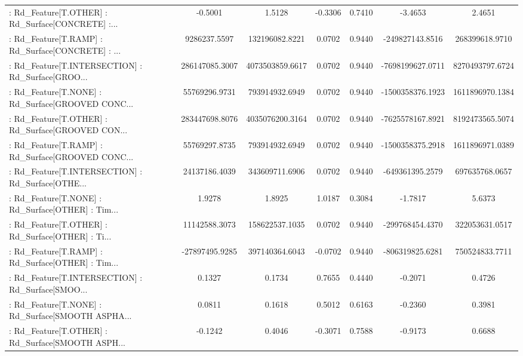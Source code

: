 \begin{longtable}{p{4cm}cccccc}
 : Rd\_Feature[T.OTHER] : Rd\_Surface[CONCRETE] :... &           -0.5001 &            1.5128 & -0.3306 &       0.7410 &            -3.4653 &            2.4651 \\
 : Rd\_Feature[T.RAMP] : Rd\_Surface[CONCRETE] : ... &      9286237.5597 &    132196082.8221 &  0.0702 &       0.9440 &    -249827143.8516 &    268399618.9710 \\
 : Rd\_Feature[T.INTERSECTION] : Rd\_Surface[GROO... &    286147085.3007 &   4073503859.6617 &  0.0702 &       0.9440 &   -7698199627.0711 &   8270493797.6724 \\
 : Rd\_Feature[T.NONE] : Rd\_Surface[GROOVED CONC... &     55769296.9731 &    793914932.6949 &  0.0702 &       0.9440 &   -1500358376.1923 &   1611896970.1384 \\
 : Rd\_Feature[T.OTHER] : Rd\_Surface[GROOVED CON... &    283447698.8076 &   4035076200.3164 &  0.0702 &       0.9440 &   -7625578167.8921 &   8192473565.5074 \\
 : Rd\_Feature[T.RAMP] : Rd\_Surface[GROOVED CONC... &     55769297.8735 &    793914932.6949 &  0.0702 &       0.9440 &   -1500358375.2918 &   1611896971.0389 \\
 : Rd\_Feature[T.INTERSECTION] : Rd\_Surface[OTHE... &     24137186.4039 &    343609711.6906 &  0.0702 &       0.9440 &    -649361395.2579 &    697635768.0657 \\
 : Rd\_Feature[T.NONE] : Rd\_Surface[OTHER] : Tim... &            1.9278 &            1.8925 &  1.0187 &       0.3084 &            -1.7817 &            5.6373 \\
 : Rd\_Feature[T.OTHER] : Rd\_Surface[OTHER] : Ti... &     11142588.3073 &    158622537.1035 &  0.0702 &       0.9440 &    -299768454.4370 &    322053631.0517 \\
 : Rd\_Feature[T.RAMP] : Rd\_Surface[OTHER] : Tim... &    -27897495.9285 &    397140364.6043 & -0.0702 &       0.9440 &    -806319825.6281 &    750524833.7711 \\
 : Rd\_Feature[T.INTERSECTION] : Rd\_Surface[SMOO... &            0.1327 &            0.1734 &  0.7655 &       0.4440 &            -0.2071 &            0.4726 \\
 : Rd\_Feature[T.NONE] : Rd\_Surface[SMOOTH ASPHA... &            0.0811 &            0.1618 &  0.5012 &       0.6163 &            -0.2360 &            0.3981 \\
 : Rd\_Feature[T.OTHER] : Rd\_Surface[SMOOTH ASPH... &           -0.1242 &            0.4046 & -0.3071 &       0.7588 &            -0.9173 &            0.6688 \\

\end{longtable}
